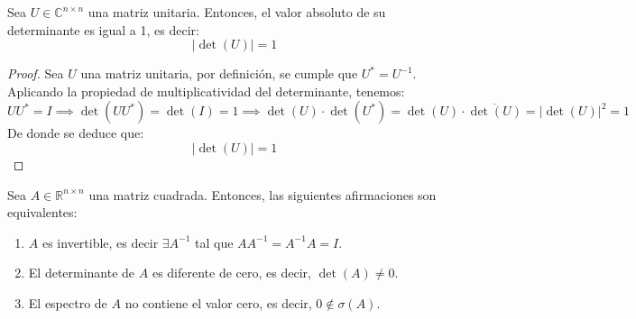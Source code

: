\begin{proposición}
    Sea \( U \in \mathbb{C}^{n \times n} \) una matriz unitaria. Entonces, el valor absoluto de su determinante es igual a 1, es decir:
    \[
        |\det(U)| = 1
    \]
\end{proposición}

\begin{proof}
    Sea \( U \) una matriz unitaria, por definición, se cumple que \( U^* = U^{-1} \). Aplicando la propiedad de multiplicatividad del determinante, tenemos:
    \[
    U U^* = I \implies
    \det(U U^*) = \det(I) = 1 \implies 
    \det(U) \cdot \det(U^*) =
    \det(U) \cdot \overline{\det(U)} =
    |\det(U)|^2 = 1
    \]
    De donde se deduce que:
    \[
        |\det(U)| = 1
    \]
\end{proof}

\begin{teorema}
    Sea \( A \in \mathbb{R}^{n \times n} \) una matriz cuadrada. Entonces, las siguientes afirmaciones son equivalentes:
    \begin{enumerate}
        \item \( A \) es invertible, es decir $\exists A^{-1}$ tal que \( AA^{-1} = A^{-1}A = I \).
        \item El determinante de \( A \) es diferente de cero, es decir, \( \det(A) \neq 0 \).
        \item El espectro de \( A \) no contiene el valor cero, es decir, \( 0 \notin \sigma(A) \).
    \end{enumerate}
\end{teorema}

